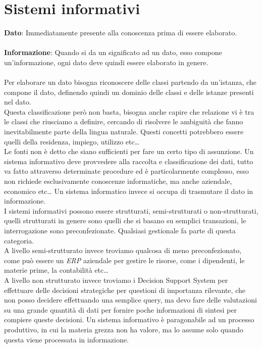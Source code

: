 \documentclass[a4paper,12pt]{report}
\begin{document}
\section{Sistemi informativi}
\textbf{Dato}: Immediatamente presente alla conoscenza prima di essere elaborato.\\\\
\textbf{Informazione}: Quando si da un significato ad un dato, esso compone un'informazione, ogni dato deve quindi essere elaborato in genere.\\\\
Per elaborare un dato bisogna riconoscere delle classi partendo da un'istanza, che compone il dato, definendo quindi un dominio delle classi e delle istanze presenti nel dato.\\
Questa classificazione però non basta, bisogna anche capire che relazione vi è tra le classi che riusciamo a definire, cercando di risolvere le ambiguità che fanno inevitabilmente parte della lingua naturale. Questi concetti potrebbero essere quelli della residenza, impiego, utilizzo etc\dots\\
Le fonti non è detto che siano sufficienti per fare un certo tipo di assunzione.
Un sistema informativo deve provvedere alla raccolta e  classificazione dei dati, tutto va fatto attraverso determinate procedure ed è particolarmente complesso, esso non richiede esclusivamente conoscenze informatiche, ma anche aziendale, economico etc\dots
Un sistema informatico invece si occupa di trasmutare il dato in informazione.\\
I sistemi informativi possono essere strutturati, semi-strutturati o non-strutturati, quelli strutturati in genere sono quelli che si basano su semplici transazioni, le interrogazione sono preconfezionate. Qualsiasi gestionale fa parte di questa categoria.\\
A livello semi-strutturato invece troviamo qualcosa di meno preconfezionato, come può essere un \textit{ERP} aziendale per gestire le risorse, come i dipendenti, le materie prime, la contabilità etc\dots\\
A livello non strutturato invece troviamo i Decision Support System per effettuare delle decisioni strategiche per questioni di importanza rilevante, che non posso decidere effettuando una semplice query, ma devo fare delle valutazioni su una grande quantità di dati per fornire poche informazioni di sintesi per compiere queste decisioni.
Un sistema informativo è paragonabile ad un processo produttivo, in cui la materia grezza non ha valore, ma lo assume solo quando questa viene processata in informazione.
\end{document}
